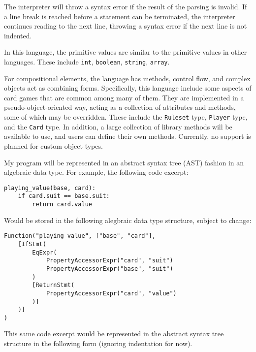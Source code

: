 \documentclass{article}
\begin{document}
The interpreter will throw a syntax error if the result of the parsing is invalid. If a line break is reached before a statement can be terminated, the interpreter continues reading to the next line, throwing a syntax error if the next line is not indented.

In this language, the primitive values are similar to the primitive values in other languages. These include \texttt{int}, \texttt{boolean}, \texttt{string}, \texttt{array}. 

For compositional elements, the language has methods, control flow, and complex objects act as combining forms. Specifically, this language include some aspects of card games that are common among many of them. They are implemented in a pseudo-object-oriented way, acting as a collection of attributes and methods, some of which may be overridden. These include the \texttt{Ruleset} type, \texttt{Player} type, and the \texttt{Card} type. In addition, a large collection of library methods will be available to use, and users can define their own methods. Currently, no support is planned for custom object types.

My program will be represented in an abstract syntax tree (AST) fashion in an algebraic data type. For example, the following code excerpt:

\begin{lstlisting}
playing_value(base, card):
    if card.suit == base.suit:
        return card.value
\end{lstlisting}

Would be stored in the following alegbraic data type structure, subject to change:

\begin{lstlisting}
Function("playing_value", ["base", "card"],
    [IfStmt(
        EqExpr(
            PropertyAccessorExpr("card", "suit")
            PropertyAccessorExpr("base", "suit")
        )
        [ReturnStmt(
            PropertyAccessorExpr("card", "value")
        )]
    )]
)
\end{lstlisting}

This same code excerpt would be represented in the abstract syntax tree structure in the following form (ignoring indentation for now).
\end{document}
